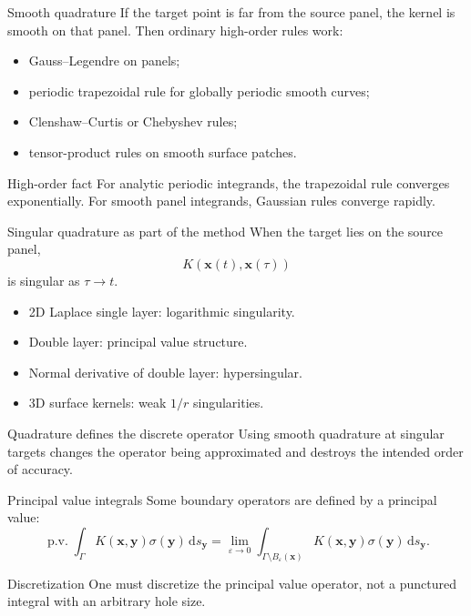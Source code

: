 \documentclass[aspectratio=169,11pt]{beamer}
\newcommand{\dd}{\,\mathrm d}
\newcommand{\x}{\bm{x}}
\newcommand{\y}{\bm{y}}
\newcommand{\eps}{\varepsilon}
\begin{document}
\begin{frame}{Smooth quadrature}
\small
If the target point is far from the source panel, the kernel is smooth on that panel.
Then ordinary high-order rules work:
\begin{itemize}
  \item Gauss--Legendre on panels;
  \item periodic trapezoidal rule for globally periodic smooth curves;
  \item Clenshaw--Curtis or Chebyshev rules;
  \item tensor-product rules on smooth surface patches.
\end{itemize}

\begin{block}{High-order fact}
For analytic periodic integrands, the trapezoidal rule converges exponentially.
For smooth panel integrands, Gaussian rules converge rapidly.
\end{block}
\end{frame}

\begin{frame}{Singular quadrature as part of the method}
\small
When the target lies on the source panel,
\[
  K(\x(t),\x(\tau))
\]
is singular as $\tau\to t$.

\begin{itemize}
  \item 2D Laplace single layer: logarithmic singularity.
  \item Double layer: principal value structure.
  \item Normal derivative of double layer: hypersingular.
  \item 3D surface kernels: weak $1/r$ singularities.
\end{itemize}

\begin{block}{Quadrature defines the discrete operator}
Using smooth quadrature at singular targets changes the operator being
approximated and destroys the intended order of accuracy.
\end{block}
\end{frame}

\begin{frame}{Principal value integrals}
\small
Some boundary operators are defined by a principal value:
\[
\operatorname{p.v.}\int_\Gamma K(\x,\y)\sigma(\y)\dd s_{\y}
=
\lim_{\eps\to0}
\int_{\Gamma\setminus B_\eps(\x)}
K(\x,\y)\sigma(\y)\dd s_{\y}.
\]

\begin{block}{Discretization}
One must discretize the principal value operator, not a punctured integral
with an arbitrary hole size.
\end{block}
\end{frame}
\end{document}

